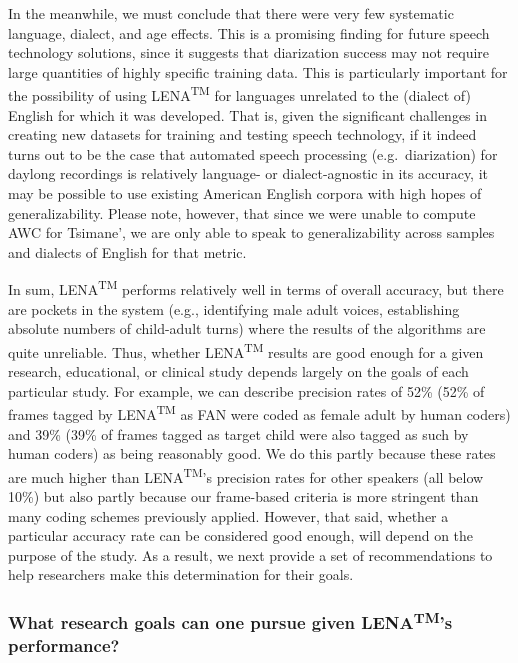 \documentclass[english,floatsintext,man]{apa6}
\begin{document}
In the meanwhile, we must conclude that there were very few systematic
language, dialect, and age effects. This is a promising finding for
future speech technology solutions, since it suggests that diarization
success may not require large quantities of highly specific training
data. This is particularly important for the possibility of using
LENA\textsuperscript{TM} for languages unrelated to the (dialect of)
English for which it was developed. That is, given the significant
challenges in creating new datasets for training and testing speech
technology, if it indeed turns out to be the case that automated speech
processing (e.g.~diarization) for daylong recordings is relatively
language- or dialect-agnostic in its accuracy, it may be possible to use
existing American English corpora with high hopes of generalizability.
Please note, however, that since we were unable to compute AWC for
Tsimane', we are only able to speak to generalizability across samples
and dialects of English for that metric.

In sum, LENA\textsuperscript{TM} performs relatively well in terms of
overall accuracy, but there are pockets in the system (e.g., identifying
male adult voices, establishing absolute numbers of child-adult turns)
where the results of the algorithms are quite unreliable. Thus, whether
LENA\textsuperscript{TM} results are good enough for a given research,
educational, or clinical study depends largely on the goals of each
particular study. For example, we can describe precision rates of 52\%
(52\% of frames tagged by LENA\textsuperscript{TM} as FAN were coded as
female adult by human coders) and 39\% (39\% of frames tagged as target
child were also tagged as such by human coders) as being reasonably
good. We do this partly because these rates are much higher than
LENA\textsuperscript{TM}'s precision rates for other speakers (all below
10\%) but also partly because our frame-based criteria is more stringent
than many coding schemes previously applied. However, that said, whether
a particular accuracy rate can be considered good enough, will depend on
the purpose of the study. As a result, we next provide a set of
recommendations to help researchers make this determination for their
goals.

\subsubsection{\texorpdfstring{What research goals can one pursue given
LENA\textsuperscript{TM}'s
performance?}{What research goals can one pursue given LENATM's performance?}}\label{what-research-goals-can-one-pursue-given-lenatms-performance}
\end{document}

